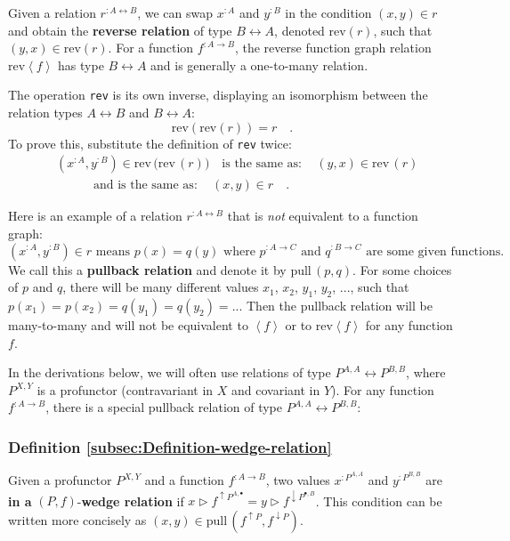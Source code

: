 Given a relation $r^{:A\leftrightarrow B}$, we can swap $x^{:A}$
and $y^{:B}$ in the condition $(x,y)\in r$ and obtain the \textbf{reverse
relation} of type $B\leftrightarrow A$, denoted $\text{rev}\left(r\right)$,
such that $(y,x)\in\text{rev}\left(r\right)$. For a function $f^{:A\rightarrow B}$,
the reverse function graph relation $\text{rev}\left<f\right>$ has
type $B\leftrightarrow A$ and is generally a one-to-many relation. 

The operation \lstinline!rev! is its own inverse, displaying an isomorphism
between the relation types $A\leftrightarrow B$ and $B\leftrightarrow A$:
\[
\text{rev}\left(\text{rev}\left(r\right)\right)=r\quad.
\]
To prove this, substitute the definition of \lstinline!rev! twice:
\begin{align*}
 & (x^{:A},y^{:B})\in\text{rev}\,\big(\text{rev}\,(r)\big)\quad\text{is the same as}:\quad(y,x)\in\text{rev}\,(r)\\
 & \quad\quad\quad\text{and is the same as}:\quad(x,y)\in r\quad.
\end{align*}

Here is an example of a relation $r^{:A\leftrightarrow B}$ that is
\emph{not} equivalent to a function graph:
\[
(x^{:A},y^{:B})\in r\text{ means }p(x)=q(y)\text{ where }p^{:A\rightarrow C}\text{ and }q^{:B\rightarrow C}\text{ are some given functions.}
\]
We call this a \textbf{pullback relation}
and denote it by $\text{pull}\,(p,q)$. For some choices of $p$ and
$q$, there will be many different values $x_{1}$, $x_{2}$, $y_{1}$,
$y_{2}$, ..., such that $p(x_{1})=p(x_{2})=q(y_{1})=q(y_{2})=...$
Then the pullback relation will be many-to-many and will not be equivalent
to $\left<f\right>$ or to $\text{rev}\left<f\right>$ for any function
$f$. 

In the derivations below, we will often use relations of type $P^{A,A}\leftrightarrow P^{B,B}$,
where $P^{X,Y}$ is a profunctor (contravariant in $X$ and covariant
in $Y$). For any function $f^{:A\rightarrow B}$, there is a special
pullback relation of type $P^{A,A}\leftrightarrow P^{B,B}$: 

\subsubsection{Definition \label{subsec:Definition-wedge-relation}\ref{subsec:Definition-wedge-relation}}

Given a profunctor
$P^{X,Y}$ and a function $f^{:A\rightarrow B}$, two values $x^{:P^{A,A}}$
and $y^{:P^{B,B}}$ are \textbf{in a} $\left(P,f\right)$-\textbf{wedge
relation} if $x\triangleright f^{\uparrow P^{A,\bullet}}=y\triangleright f^{\downarrow P^{\bullet,B}}$.
This condition can be written more concisely as $(x,y)\in\text{pull}\,(f^{\uparrow P},f^{\downarrow P})$.


